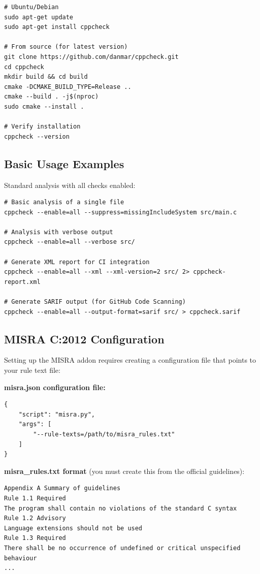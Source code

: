\documentclass[11pt,letterpaper]{report}
\begin{document}
\begin{verbatim}
# Ubuntu/Debian
sudo apt-get update
sudo apt-get install cppcheck

# From source (for latest version)
git clone https://github.com/danmar/cppcheck.git
cd cppcheck
mkdir build && cd build
cmake -DCMAKE_BUILD_TYPE=Release ..
cmake --build . -j$(nproc)
sudo cmake --install .

# Verify installation
cppcheck --version
\end{verbatim}

\subsection{Basic Usage Examples}

Standard analysis with all checks enabled:

\begin{verbatim}
# Basic analysis of a single file
cppcheck --enable=all --suppress=missingIncludeSystem src/main.c

# Analysis with verbose output
cppcheck --enable=all --verbose src/

# Generate XML report for CI integration
cppcheck --enable=all --xml --xml-version=2 src/ 2> cppcheck-report.xml

# Generate SARIF output (for GitHub Code Scanning)
cppcheck --enable=all --output-format=sarif src/ > cppcheck.sarif
\end{verbatim}

\subsection{MISRA C:2012 Configuration}

Setting up the MISRA addon requires creating a configuration file that points to your rule text file:

\textbf{misra.json configuration file:}

\begin{verbatim}
{
    "script": "misra.py",
    "args": [
        "--rule-texts=/path/to/misra_rules.txt"
    ]
}
\end{verbatim}

\textbf{misra\_rules.txt format} (you must create this from the official guidelines):

\begin{verbatim}
Appendix A Summary of guidelines
Rule 1.1 Required
The program shall contain no violations of the standard C syntax
Rule 1.2 Advisory
Language extensions should not be used
Rule 1.3 Required
There shall be no occurrence of undefined or critical unspecified behaviour
...
\end{verbatim}
\end{document}
